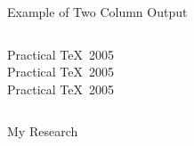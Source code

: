 \documentclass[table]{beamer}
\begin{document}
\begin{frame}{Example of Two Column Output}
    \begin{columns}[c]
        \column{1.5in}
            Practical \TeX\ 2005\\
            Practical \TeX\ 2005\\
            Practical \TeX\ 2005
        \column{1.5in}
    \end{columns}
\end{frame}%


\begin{frame}{My Research}
\end{frame}%
\end{document}
